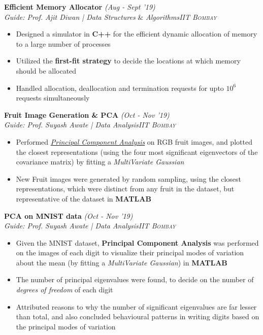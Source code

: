 \documentclass{article}
\begin{document}
\vspace{-5pt}
\textbf{Efficient Memory Allocator} \hfill{\sl \small (Aug - Sept '19)}\\{\it Guide: Prof. Ajit Diwan | Data Structures} \& {\it Algorithms}\hfill{\sl \small \textsc{IIT Bombay}}\\
\vspace{-19pt}
\begin{itemize}[itemsep = -1 mm, leftmargin=*]
  \item Designed a simulator in \textbf{C++} for the efficient dynamic allocation of memory to a large number of processes
   \item Utilized the \textbf{first-fit strategy} to decide the locations at which memory should be allocated
   \item Handled allocation, deallocation and termination requests for upto $10^{\text{6}}$ requests simultaneously
\end{itemize}
\vspace{-5pt}
\textbf{Fruit Image Generation \& PCA} \hfill{\sl \small (Oct - Nov '19)}\\{\it Guide: Prof. Suyash Awate | Data Analysis}\hfill{\sl \small \textsc{IIT Bombay}}\\
\vspace{-19pt}
\begin{itemize}[itemsep = -1 mm, leftmargin=*]
   \item Performed \textit{\underline{Principal Component Analysis}} on RGB fruit images, and plotted the closest representations (using the four most significant eigenvectors of the covariance matrix) by fitting a \textit{MultiVariate Gaussian}
    \item New Fruit images were generated by random sampling, using the closest representations, which were distinct from any fruit in the dataset, but representative of the dataset in \textbf{MATLAB}
\end{itemize}
\vspace{-5pt}
\textbf{PCA on MNIST data} \hfill{\sl \small (Oct - Nov '19)}\\{\it Guide: Prof. Suyash Awate | Data Analysis}\hfill{\sl \small \textsc{IIT Bombay}}\\
\vspace{-19pt}
\begin{itemize}[itemsep = -1 mm, leftmargin=*]
   \item Given the MNIST dataset, \textbf{Principal Component Analysis} was performed on the images of each digit to visualize their principal modes of variation about the mean (by fitting a \textit {MultiVariate Gaussian}) in \textbf{MATLAB}
    \item The number of principal eigenvalues were found, to decide on the number of \textit{degrees of freedom} of each digit
    \item Attributed reasons to why the number of significant eigenvalues are far lesser than total, and also concluded behavioural patterns in writing digits based on the principal modes of variation
\end{itemize}
\end{document}
